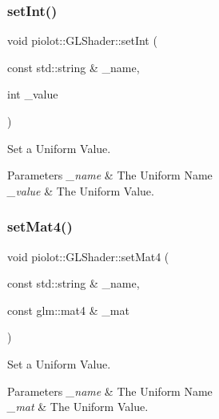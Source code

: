 \subsubsection{\texorpdfstring{set\+Int()}{setInt()}}
{\footnotesize\ttfamily void piolot\+::\+G\+L\+Shader\+::set\+Int (\begin{DoxyParamCaption}\item[{const std\+::string \&}]{\+\_\+name,  }\item[{int}]{\+\_\+value }\end{DoxyParamCaption})\hspace{0.3cm}{\ttfamily [inline]}}



Set a Uniform Value. 


\begin{DoxyParams}{Parameters}
{\em \+\_\+name} & The Uniform Name \\
\hline
{\em \+\_\+value} & The Uniform Value. \\
\hline
\end{DoxyParams}
\mbox{\label{classpiolot_1_1_g_l_shader_a56d846ae1d7c6adc579c5de37db02546}} 
\subsubsection{\texorpdfstring{set\+Mat4()}{setMat4()}}
{\footnotesize\ttfamily void piolot\+::\+G\+L\+Shader\+::set\+Mat4 (\begin{DoxyParamCaption}\item[{const std\+::string \&}]{\+\_\+name,  }\item[{const glm\+::mat4 \&}]{\+\_\+mat }\end{DoxyParamCaption})\hspace{0.3cm}{\ttfamily [inline]}}



Set a Uniform Value. 


\begin{DoxyParams}{Parameters}
{\em \+\_\+name} & The Uniform Name \\
\hline
{\em \+\_\+mat} & The Uniform Value. \\
\hline
\end{DoxyParams}
\mbox{\label{classpiolot_1_1_g_l_shader_a47d614244dc667768a36b9cea1675eca}} 
